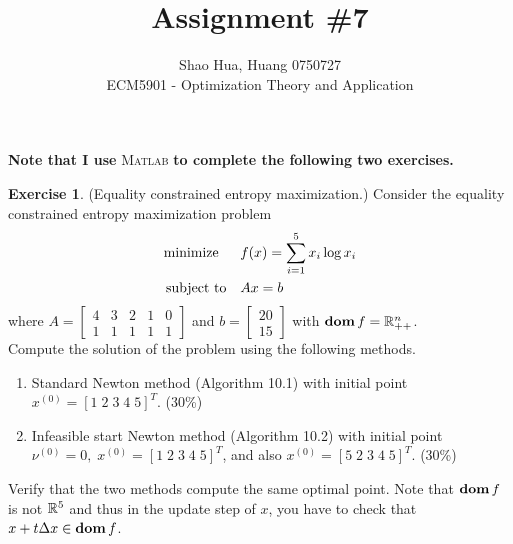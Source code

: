 \documentclass[12pt]{extarticle}
\title{Assignment \#7}
\author{Shao Hua, Huang 0750727\\
ECM5901 - Optimization Theory and Application}
\theoremstyle{definition}
\newtheorem{exercise}{Exercise}
\begin{document}
\maketitle

\textbf{Note that I use} \textsc{Matlab} \textbf{to complete the following two exercises.}
\begin{exercise}
  (Equality constrained entropy maximization.)
  Consider the equality constrained entropy maximization problem
  \begin{align*}
    \text{minimize\;\;}\quad& f(x)=\sum_{i=1}^5x_i\log x_i\\
    \text{subject to}  \quad& Ax=b
  \end{align*}
  where $A=\begin{bmatrix}4&3&2&1&0\\1&1&1&1&1\end{bmatrix}$ and $b=\begin{bmatrix}20\\15\end{bmatrix}$ with $\mathop{\bf dom} f=\mathbb{R}_{++}^n$.\\
  Compute the solution of the problem using the following methods.
  \begin{enumerate}[label=(\alph*)]
    \item Standard Newton method (Algorithm 10.1) with initial point $x^{(0)}=[1\;2\;3\;4\;5]^T$. (30\%)
    \item Infeasible start Newton method (Algorithm 10.2) with initial point $\nu^{(0)}=0,\;x^{(0)}=[1\;2\;3\;4\;5]^T$, and also $x^{(0)}=[5\;2\;3\;4\;5]^T$. (30\%)
  \end{enumerate}
  Verify that the two methods compute the same optimal point.
  Note that $\mathop{\bf dom} f$ is not $\mathbb{R}^5$ and thus in the update step of $x$, you have to check that $x+t\Delta x\in\mathop{\bf dom} f$.
\end{exercise}
\end{document}

